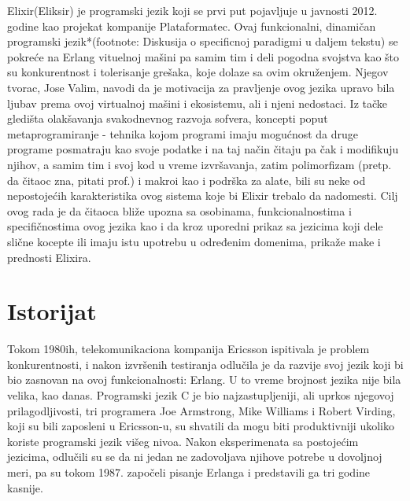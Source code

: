 \documentclass[a4paper]{article}
\begin{document}
Elixir(Eliksir) je programski jezik koji se prvi put pojavljuje u javnosti 2012. godine kao projekat kompanije Plataformatec. Ovaj funkcionalni, dinamičan programski jezik*(footnote: Diskusija o specificnoj paradigmi u daljem tekstu) se pokreće na Erlang vituelnoj mašini pa samim tim i deli pogodna svojstva kao što su konkurentnost i tolerisanje grešaka, koje dolaze sa ovim okruženjem. Njegov tvorac, Jose Valim, navodi da je motivacija za pravljenje ovog jezika upravo bila ljubav prema ovoj virtualnoj mašini i ekosistemu, ali i njeni nedostaci. Iz tačke gledišta olakšavanja svakodnevnog razvoja sofvera, koncepti poput metaprogramiranje - tehnika kojom programi imaju mogućnost da druge programe posmatraju kao svoje podatke i na taj način čitaju pa čak i modifikuju njihov, a samim tim i svoj kod u vreme izvršavanja, zatim polimorfizam (pretp. da čitaoc zna, pitati prof.) i makroi kao i podrška za alate, bili su neke od nepostojećih karakteristika ovog sistema koje bi Elixir trebalo da nadomesti. Cilj ovog rada je da čitaoca bliže upozna sa osobinama, funkcionalnostima i specifičnostima ovog jezika kao i da kroz uporedni prikaz sa jezicima koji dele slične kocepte ili imaju istu upotrebu u određenim domenima, prikaže make i prednosti Elixira.

\section{Istorijat}
\label{sec:istorijat}

Tokom 1980ih, telekomunikaciona kompanija Ericsson ispitivala je problem konkurentnosti, i nakon izvršenih testiranja odlučila je da razvije svoj jezik koji bi bio zasnovan na ovoj funkcionalnosti: Erlang. U to vreme brojnost jezika nije bila velika, kao danas. Programski jezik C je bio najzastupljeniji, ali uprkos njegovoj prilagodljivosti, tri programera Joe Armstrong, Mike Williams i Robert Virding, koji su bili zaposleni u Ericsson-u, su shvatili da mogu biti produktivniji ukoliko koriste programski jezik višeg nivoa. Nakon eksperimenata sa postojećim jezicima, odlučili su se da ni jedan ne zadovoljava njihove potrebe u dovoljnoj meri, pa su tokom 1987. započeli pisanje Erlanga i predstavili ga tri godine kasnije.
\end{document}
